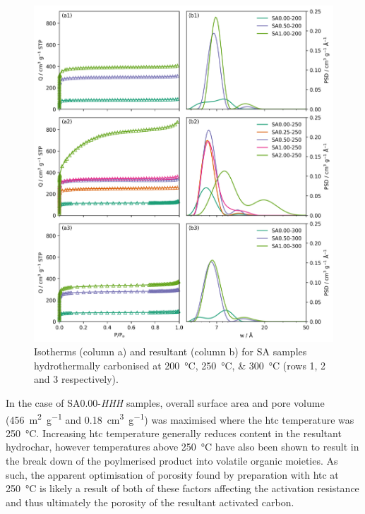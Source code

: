 \begin{figure}[ht!]
    \centering
    \includegraphics[width=\columnwidth, keepaspectratio]{4-impregnation/figs/SA_n2_isotherms.png}
    \caption{Isotherms (column a) and resultant  (column b) for SA samples hydrothermally carbonised at \qtylist[list-units=single]{200;250;300}{\degreeCelsius} (rows 1, 2 and 3 respectively).}
    \label{fig:SA_n2_isotherms}
\end{figure}

In the case of SA0.00-\textit{HHH} samples, overall surface area and pore volume (\qty{456}{\metre\squared\per\gram} and \qty{0.18}{\cm\cubed\per\gram}) was maximised where the \gls{htc} temperature was \qty{250}{\degreeCelsius}. Increasing \gls{htc} temperature generally reduces  content in the resultant \gls{hydrochar},\citep{Sevilla2009a, parshetti2013chemical, kim2014hydrothermal} however temperatures above \qty{250}{\degreeCelsius} have also been shown to result in the break down of the poylmerised product into volatile organic moieties.\citep{gao2012characterization, Xiao2012Hydrothermal, wang2018review} As such, the apparent optimisation of porosity found by preparation with \gls{htc} at \qty{250}{\degreeCelsius} is likely a result of both of these factors affecting the activation resistance\citep{Altwala2020Predictable, Blankenship2022Modulating} and thus ultimately the porosity of the resultant activated carbon.

